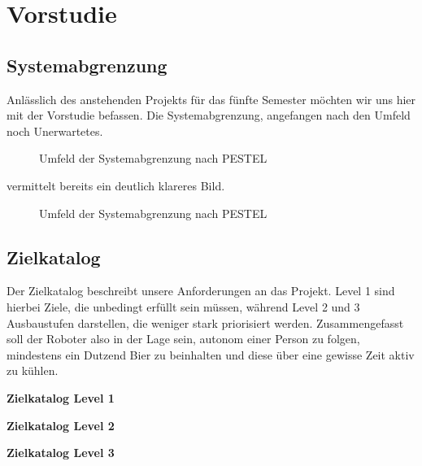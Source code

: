 \section{Vorstudie}

\subsection{Systemabgrenzung}

Anlässlich des anstehenden Projekts für das fünfte Semester möchten wir uns 
hier mit der Vorstudie befassen. Die Systemabgrenzung, angefangen nach den Umfeld
noch Unerwartetes.

\begin{figure}[h]
\begin{center}
\end{center}
\caption{Umfeld der Systemabgrenzung nach PESTEL}
\label{fig:pestel}
\end{figure}

\pagebreak

vermittelt bereits ein deutlich klareres Bild.

\begin{figure}[h]
\begin{center}
\end{center}
\caption{Umfeld der Systemabgrenzung nach PESTEL}
\label{fig:systemabgrenzung}
\end{figure}

\subsection{Zielkatalog}

Der Zielkatalog beschreibt unsere Anforderungen an das Projekt. Level 1 sind 
hierbei Ziele, die unbedingt erfüllt sein müssen, während Level 2 und 3 
Ausbaustufen darstellen, die weniger stark priorisiert werden. Zusammengefasst 
soll der Roboter also in der Lage sein, autonom einer Person zu folgen, 
mindestens ein Dutzend Bier zu beinhalten und diese über eine gewisse Zeit 
aktiv zu kühlen.

\textbf{Zielkatalog Level 1}



\textbf{Zielkatalog Level 2}



\textbf{Zielkatalog Level 3}

